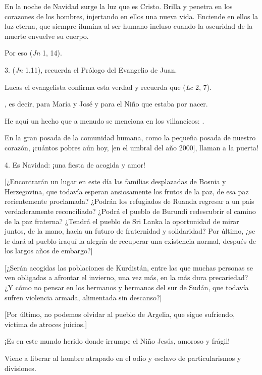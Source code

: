 \begin{body}
	En la noche de Navidad surge la luz que es Cristo. Brilla y penetra en los corazones de los hombres, injertando en ellos una nueva vida. Enciende en ellos la luz eterna, que siempre ilumina al ser humano incluso cuando la oscuridad de la muerte envuelve su cuerpo.
	
	Por eso  (\emph{Jn} 1, 14).
	
	3.  (\emph{Jn} 1,11), recuerda el Prólogo del Evangelio de Juan.
	
	Lucas el evangelista confirma esta verdad y recuerda que  (\emph{Lc} 2, 7).
	
	, es decir, para María y José y para el Niño que estaba por nacer.
	
	He aquí un hecho que a menudo se menciona en los villancicos: .
	
	En la gran posada de la comunidad humana, como la pequeña posada de nuestro corazón, ¡cuántos pobres aún hoy, {[}en el umbral del año 2000{]}, llaman a la puerta!
	
	4. Es Navidad: ¡una fiesta de acogida y amor!
	
	{[}¿Encontrarán un lugar en este día las familias desplazadas de Bosnia y Herzegovina, que todavía esperan ansiosamente los frutos de la paz, de esa paz recientemente proclamada? ¿Podrán los refugiados de Ruanda regresar a un país verdaderamente reconciliado? ¿Podrá el pueblo de Burundi redescubrir el camino de la paz fraterna? ¿Tendrá el pueblo de Sri Lanka la oportunidad de mirar juntos, de la mano, hacia un futuro de fraternidad y solidaridad? Por último, ¿se le dará al pueblo iraquí la alegría de recuperar una existencia normal, después de los largos años de embargo?{]}
	
	{[}¿Serán acogidas las poblaciones de Kurdistán, entre las que muchas personas se ven obligadas a afrontar el invierno, una vez más, en la más dura precariedad? ¿Y cómo no pensar en los hermanos y hermanas del sur de Sudán, que todavía sufren violencia armada, alimentada sin descanso?{]}
	
	{[}Por último, no podemos olvidar al pueblo de Argelia, que sigue sufriendo, víctima de atroces juicios.{]}
	
	¡Es en este mundo herido donde irrumpe el Niño Jesús, amoroso y frágil!
	
	Viene a liberar al hombre atrapado en el odio y esclavo de particularismos y divisiones.
	

\end{body}
